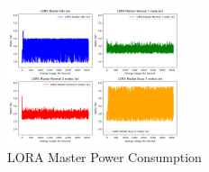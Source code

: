 \begin{figure}[H]
  \begin{center}
    \includegraphics[width=0.45\textwidth]{./Figures/Power_Consumption/LORA_MASTER.png}
  \end{center}
  \caption{LORA Master Power Consumption}\label{fig:loramaster_power_consumption}
\end{figure}